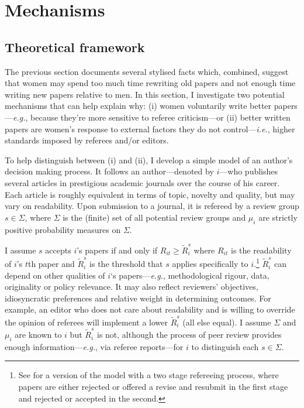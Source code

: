 \section{Mechanisms}
\label{mechanisms}

\subsection{Theoretical framework}
\label{seumodel}

The previous section documents several stylised facts which, combined, suggest that women may spend too much time rewriting old papers and not enough time writing new papers relative to men. In this section, I investigate two potential mechanisms that can help explain why: (i) women voluntarily write better papers---\emph{e.g.}, because they're more sensitive to referee criticism---or (ii) better written papers are women's response to external factors they do not control---\emph{i.e.}, higher standards imposed by referees and\slash or editors.

To help distinguish between (i) and (ii), I develop a simple model of an author's decision making process. It follows an author---denoted by $i$---who publishes several articles in prestigious academic journals over the course of his career. Each article is roughly equivalent in terms of topic, novelty and quality, but may vary on readability. Upon submission to a journal, it is refereed by a review group $s\in\Sigma$, where $\Sigma$ is the (finite) set of all potential review groups and $\mu_i$ are strictly positive probability measures on $\Sigma$.

I assume $s$ accepts $i$'s papers if and only if $R_{it}\ge\widetilde R_i^s$ where $R_{it}$ is the readability of $i$'s $t$th paper and $\widetilde R_i^s$ is the threshold that $s$ applies specifically to $i$.\footnote{See  \citet{Hengel2017} for a version of the model with a two stage refereeing process, where papers are either rejected or offered a revise and resubmit in the first stage and rejected or accepted in the second.} $\widetilde R_i^s$ can depend on other qualities of $i$`s papers---\emph{e.g.}, methodological rigour, data, originality or policy relevance. It may also reflect reviewers' objectives, idiosyncratic preferences and relative weight in determining outcomes. For example, an editor who does not care about readability and is willing to override the opinion of referees will implement a lower $\widetilde R_i^s$ (all else equal). I assume $\Sigma$ and $\mu_i$ are known to $i$ but $\widetilde R_i^s$ is not, although the process of peer review provides enough information---\emph{e.g.}, via referee reports---for $i$ to distinguish each $s\in\Sigma$.

